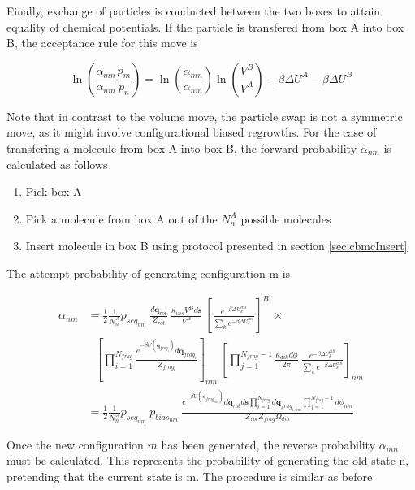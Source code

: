 Finally, exchange of particles is conducted between the two boxes to attain equality of chemical potentials.
If the particle is transfered from box A into box B, the acceptance rule for this move is

\begin{equation}
\ln \left( \frac{\alpha_{mn}}{\alpha_{nm}} \frac{p_m}{p_n} \right) = \ln \left( \frac{\alpha_{mn}}{\alpha_{nm}} \right)  \ln \left(\frac{V^B}{V^A}\right) -\beta \Delta U^A - \beta \Delta U^B
\label{eq:gemc_nvt_transfer}
\end{equation}

Note that in contrast to the volume move, the particle swap is not a symmetric move, as it might 
involve configurational biased regrowths. For the case of transfering a molecule from box A into box B, the forward probability $\alpha_{nm}$ is calculated
as follows

\begin{enumerate}
\item Pick box A
\item Pick a molecule from box A out of the $N^A_n$ possible molecules
\item Insert molecule in box B using protocol presented in section \ref{sec:cbmcInsert}
\end{enumerate}

The attempt probability of generating configuration m is

\begin{align}
\alpha_{nm} &= \frac{1}{2} \frac{1}{N^A_n} p_{seq_{nm}}\ \frac{d\mathbf{q}_{rot}}{Z_{rot}}\ \frac{\kappa_{ins}V^B d\mathbf{s}}{V^B}\ \left[\frac{e^{-\beta \Delta U_k^{ins}}}{\sum_k{e^{-\beta \Delta U_k^{ins}}}}\right]^B\ \times \nonumber \\
&\ \ \ \left[\prod_{i=1}^{N_{frag}}{\frac{e^{-\beta U(\mathbf{q}_{frag_i})}d\mathbf{q}_{frag_i}}{Z_{frag_i}}}\right]_{nm}\ \left[\prod_{j=1}^{N_{frag}-1}{\frac{\kappa_{dih}d\phi}{2\pi}\ \frac{e^{-\beta \Delta U_k^{dih}}}{\sum_k{e^{-\beta \Delta U_k^{dih}}}}}\right]_{nm} \\
\label{eq:gemc_nvt_transfer_forward}
& = \frac{1}{2} \frac{1}{N^A_n} p_{seq_{nm}}\ p_{bias_{nm}}\ \frac{e^{-\beta U(\mathbf{q}_{frag_{nm}})}d\mathbf{q}_{rot}d\mathbf{s}\prod_{i=1}^{N_{frag}}d\mathbf{q}_{frag_{i,nm}}\prod_{j=1}^{N_{frag}-1}d\phi_{nm}}{Z_{rot}Z_{frag}\Omega_{dih}}
\end{align}


Once the new configuration $m$ has been generated, the reverse probability $\alpha_{mn}$ must be calculated. This represents
the probability of generating the old state n, pretending that the current state is m.
The procedure is similar as before

